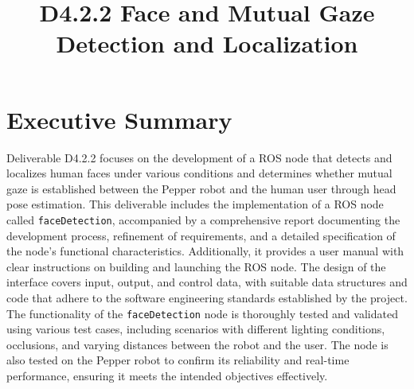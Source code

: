 \documentclass{CSSRforAfrica}
\begin{document}




\title{D4.2.2 Face and Mutual Gaze Detection and Localization}  

\partner{}                                      




\maketitle
 

\section*{Executive Summary}
\label{executive_summary}
Deliverable D4.2.2 focuses on the development of a ROS node that detects and localizes human faces under various conditions and determines whether mutual gaze is established between the Pepper robot and the human user through head pose estimation. This deliverable includes the implementation of a ROS node called \texttt{faceDetection}, accompanied by a comprehensive report documenting the development process, refinement of requirements, and a detailed specification of the node's functional characteristics. Additionally, it provides a user manual with clear instructions on building and launching the ROS node. The design of the interface covers input, output, and control data, with suitable data structures and code that adhere to the software engineering standards established by the project. The functionality of the \texttt{faceDetection} node is thoroughly tested and validated using various test cases, including scenarios with different lighting conditions, occlusions, and varying distances between the robot and the user. The node is also tested on the Pepper robot to confirm its reliability and real-time performance, ensuring it meets the intended objectives effectively.
\end{document}
